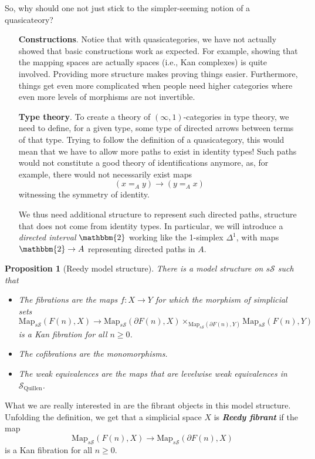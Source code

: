 \documentclass{article}
\newcommand{\textbi}[1]{\textbf{\textit{#1}}}
\newcommand{\cS}{\mathcal{S}}
\newcommand{\sS}{s\cS}
\newcommand{\Map}{\mathrm{Map}}
\newtheorem{prop}[subsection]{Proposition}
\theoremstyle{definition}
\begin{document}
So, why should one not just stick to the simpler-seeming notion of a quasicateory?

\begin{itemize}
    \item[\textbf{Constructions}.] Notice that with quasicategories, we have not actually showed that basic constructions work as expected. For example, showing that the mapping spaces are actually spaces (i.e., Kan complexes) is quite involved. Providing more structure makes proving things easier. Furthermore, things get even more complicated when people need higher categories where even more levels of morphisms are not invertible.
    \item[\textbf{Type theory}.] To create a theory of $(\infty,1)$-categories in type theory, we need to define, for a given type, some type of directed arrows between terms of that type. Trying to follow the definition of a quasicategory, this would mean that we have to allow more paths to exist in identity types! Such paths would not constitute a good theory of identifications anymore, as, for example, there would not necessarily exist maps $$(x=_Ay)\to (y=_Ax)$$ witnessing the symmetry of identity. 
    \par We thus need additional structure to represent such directed paths, structure that does not come from identity types. In particular, we will introduce a \textit{directed interval} $\mathbbm{2}$ working like the 1-simplex $\Delta^1$, with maps $\mathbbm{2}\to A$ representing directed paths in $A$. 
\end{itemize}

\begin{prop}[Reedy model structure]
    There is a model structure on $\sS$ such that
    \begin{itemize}
        \item The fibrations are the maps $f:X\to Y$ for which the morphism of simplicial sets $$\Map_{\sS}(F(n),X)\to \Map_{\sS}(\partial F(n), X)\times_{\Map_{\sS}(\partial F(n),Y)}\Map_{\sS}(F(n),Y)$$ is a Kan fibration for all $n\geq 0$. 
        \item The cofibrations are the monomorphisms.
        \item The weak equivalences are the maps that are levelwise weak equivalences in $\cS_{\text{Quillen}}$.
    \end{itemize}
\end{prop}

What we are really interested in are the fibrant objects in this model structure. Unfolding the definition, we get that a simplicial space $X$ is \textbi{Reedy fibrant} if the map $$\Map_{\sS}(F(n),X)\to\Map_{\sS}(\partial F(n), X)$$ is a Kan fibration for all $n\geq 0$. 
\end{document}
